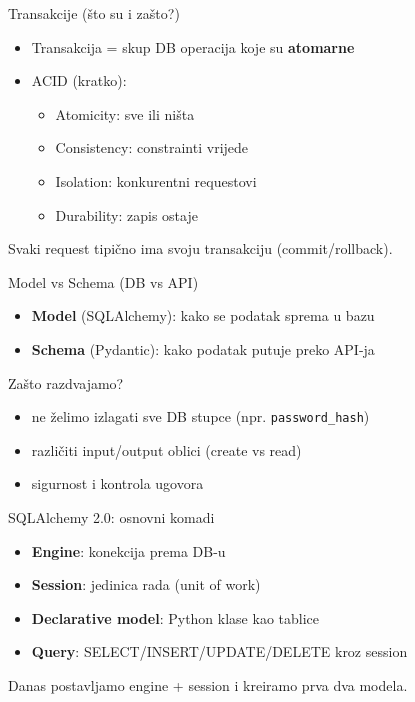 	\begin{frame}{Transakcije (što su i zašto?)}
		\begin{itemize}
			\item Transakcija = skup DB operacija koje su \textbf{atomarne}
			\item ACID (kratko):
			\begin{itemize}
				\item Atomicity: sve ili ništa
				\item Consistency: constrainti vrijede
				\item Isolation: konkurentni requestovi
				\item Durability: zapis ostaje
			\end{itemize}
		\end{itemize}
		
		\vspace{0.6em}
		Svaki request tipično ima svoju transakciju (commit/rollback).
	\end{frame}
	
	\begin{frame}{Model vs Schema (DB vs API)}
		\begin{itemize}
			\item \textbf{Model} (SQLAlchemy): kako se podatak sprema u bazu
			\item \textbf{Schema} (Pydantic): kako podatak putuje preko API-ja
		\end{itemize}
		
		\vspace{0.6em}
		Zašto razdvajamo?
		\begin{itemize}
			\item ne želimo izlagati sve DB stupce (npr. \texttt{password\_hash})
			\item različiti input/output oblici (create vs read)
			\item sigurnost i kontrola ugovora
		\end{itemize}
	\end{frame}
	
	\begin{frame}{SQLAlchemy 2.0: osnovni komadi}
		\begin{itemize}
			\item \textbf{Engine}: konekcija prema DB-u
			\item \textbf{Session}: jedinica rada (unit of work)
			\item \textbf{Declarative model}: Python klase kao tablice
			\item \textbf{Query}: SELECT/INSERT/UPDATE/DELETE kroz session
		\end{itemize}
		
		\vspace{0.6em}
		Danas postavljamo engine + session i kreiramo prva dva modela.
	\end{frame}
	
